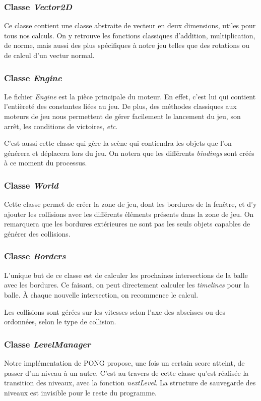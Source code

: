 \documentclass[a4paper,10pt]{article}
\theoremstyle{definition}
\begin{document}
	\subsubsection*{Classe \emph{Vector2D}}
	Ce classe contient une classe abstraite de vecteur en deux dimensions, utiles pour tous nos calculs. On y retrouve les fonctions classiques d'addition, multiplication, de norme, mais aussi des plus spécifiques à notre jeu telles que des rotations ou de calcul d'un vectur normal.
	
	\subsubsection*{Classe \emph{Engine}}
	Le fichier \emph{Engine} est la pièce principale du moteur. En effet, c'est lui qui contient l'entièreté des constantes liées au jeu. De plus, des méthodes classiques aux moteurs de jeu nous permettent de gérer facilement le lancement du jeu, son arrêt, les conditions de victoires, \emph{etc}.
	
	C'est aussi cette classe qui gère la scène qui contiendra les objets que l'on générera et déplacera lors du jeu. On notera que les différents \emph{bindings} sont créés à ce moment du processus.
	
        \subsubsection*{Classe \emph{World}}
        Cette classe permet de créer la zone de jeu, dont les bordures de la fenêtre, et d'y ajouter les collisions avec les différents éléments présents dans la zone de jeu. On remarquera que les bordures extérieures ne sont pas les seuls objets capables de générer des collisions. 
        
        \subsubsection*{Classe \emph{Borders}}
        L'unique but de ce classe est de calculer les prochaines intersections de la balle avec les bordures. Ce faisant, on peut directement calculer les \emph{timelines} pour la balle. À chaque nouvelle intersection, on recommence le calcul.
        
        Les collisions sont gérées sur les vitesses selon l'axe des abscisses ou des ordonnées, selon le type de collision.
        
        \subsubsection*{Classe \emph{LevelManager}}
        Notre implémentation de PONG propose, une fois un certain score atteint, de passer d'un niveau à un autre. C'est au travers de cette classe qu'est réalisée la transition des niveaux, avec la fonction \emph{nextLevel}. La structure de sauvegarde des niveaux est invisible pour le reste du programme.
        
\end{document}
